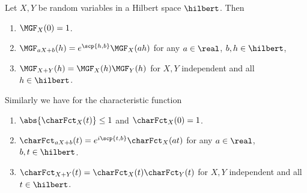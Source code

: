 \begin{exercise}
    \label{ex: properties moment generating functions}
    Let \(X, Y\) be random variables in a Hilbert space \(\hilbert\).
    Then
    \begin{enumerate}[label=(\alph*)]
        \item\label{it: (mgf) zero} \(\MGF_X(0) = 1\).
        \item\label{it: (mgf) linear transformation} \(\MGF_{aX + b}(h) = e^{\scp{h,b}} \MGF_X(a h)\)
        for any \(a\in \real\), \(b, h\in \hilbert\),
        \item\label{it: (mgf) idependent sum} \(\MGF_{X+Y}(h) = \MGF_X(h) \MGF_Y(h)\) for \(X,Y\) independent and all \(h\in \hilbert\).
    \end{enumerate}
    Similarly we have for the characteristic function
    \begin{enumerate}[label=(\alph*), resume]
        \item\label{it: (charfct) bounded} \(\abs{\charFct_X(t)}\le 1\) and \(\charFct_X(0) = 1\).
        \item\label{it: (charfct) linear transformation} \(\charFct_{aX + b}(t) = e^{i\scp{t,b}} \charFct_X(a t)\)
        for any \(a\in \real\), \(b, t\in \hilbert\).
        \item\label{it: (charfct) independent sum} \(\charFct_{X+Y}(t) = \charFct_X(t) \charFct_Y(t)\) for \(X,Y\) independent and all \(t\in \hilbert\).
    \end{enumerate}
\end{exercise}
